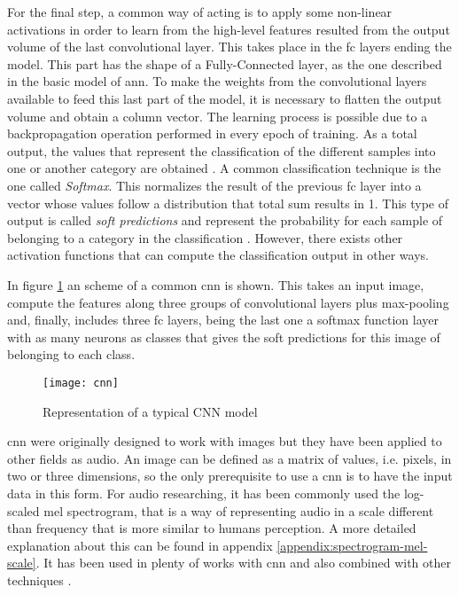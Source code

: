 	For the final step, a common way of acting is to apply some non-linear activations in order to learn from the high-level features resulted from the output volume of the last convolutional layer. This takes place in the \acrlong{fc} layers ending the model. This part has the shape of a Fully-Connected layer, as the one described in the basic model of \acrshort{ann}. To make the weights from the convolutional layers available to feed this last part of the model, it is necessary to flatten the output volume and obtain a column vector. The learning process is possible due to a backpropagation operation performed in every epoch of training. As a total output, the values that represent the classification of the different samples into one or another category are obtained \cite{Saha2018}. A common classification technique is the one called \textit{Softmax}. This normalizes the result of the previous \acrshort{fc} layer into a vector whose values follow a distribution that total sum results in 1. This type of output is called \textit{soft predictions} and represent the probability for each sample of belonging to a category in the classification \cite{Mahmood2018}. However, there exists other activation functions that can compute the classification output in other ways. 
	
	In figure \ref{fig:mesh13} an scheme of a common \acrlong{cnn} is shown. This takes an input image, compute the features along three groups of convolutional layers plus max-pooling and, finally, includes three \acrlong{fc} layers, being the last one a softmax function layer with as many neurons as classes that gives the soft predictions for this image of belonging to each class.
	
	\begin{figure}[ht]
		\centering
		\captionsetup{justification=centering}
		\texttt{[image: cnn]}
		\caption{Representation of a typical CNN model \cite{Hinz2016}}
		\label{fig:mesh13}
	\end{figure}

	\acrfull{cnn} were originally designed to work with images but they have been applied to other fields as audio. An image can be defined as a matrix of values, i.e. pixels, in two or three dimensions, so the only prerequisite to use a \acrshort{cnn} is to have the input data in this form. For audio researching, it has been commonly used the log-scaled mel spectrogram, that is a way of representing audio in a scale different than frequency that is more similar to humans perception. A more detailed explanation about this can be found in appendix \ref{appendix:spectrogram-mel-scale}. It has been used in plenty of works with \acrshort{cnn} and also combined with other techniques \cite{Salamon2017} \cite{Piczak2015} \cite{Kumar2017}.
	
	
	

	

	
	
	
	
	